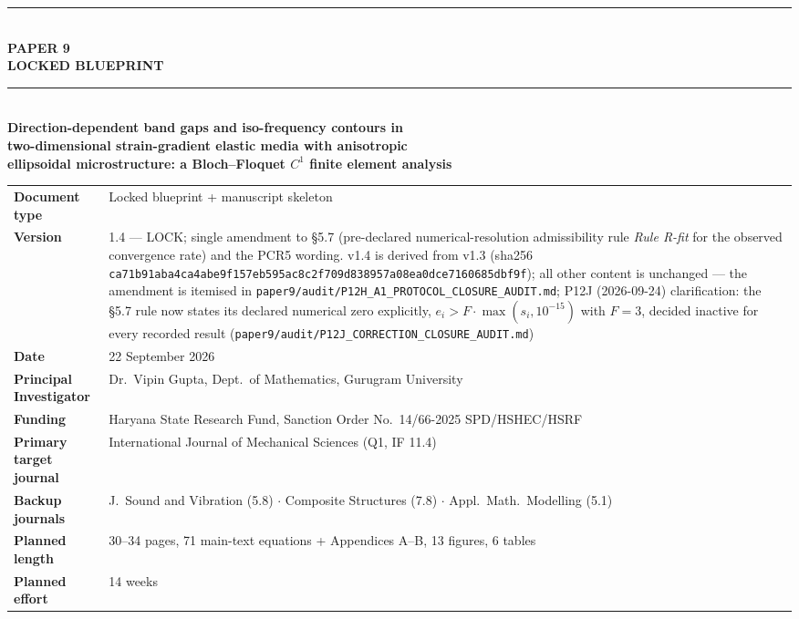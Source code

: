 \documentclass[11pt,a4paper]{article}
\begin{document}
\begin{titlepage}
\centering
\vspace*{0.6cm}
{\color{accent}\rule{\textwidth}{1.2pt}}\\[0.5cm]
{\Huge\bfseries\color{lockblue} PAPER 9}\\[0.35cm]
{\Large\bfseries LOCKED BLUEPRINT}\\[0.9cm]
{\color{accent}\rule{\textwidth}{0.6pt}}\\[1.1cm]

{\large\bfseries Direction-dependent band gaps and iso-frequency contours in\\[0.25cm]
two-dimensional strain-gradient elastic media with anisotropic\\[0.25cm]
ellipsoidal microstructure: a Bloch--Floquet $C^1$ finite element analysis}\\[1.3cm]

\begin{minipage}{0.86\textwidth}
\centering\footnotesize
\begin{tabular}{@{}>{\bfseries}p{3.5cm} p{9.6cm}@{}}
\textbf{Document type} & Locked blueprint + manuscript skeleton \\
\textbf{Version} & 1.4 --- LOCK; single amendment to \S5.7 (pre-declared numerical-resolution admissibility rule \emph{Rule R-fit} for the observed convergence rate) and the PCR5 wording. v1.4 is derived from v1.3 (sha256 \texttt{ca71b91aba4ca4abe9f157eb595ac8c2f709d838957a08ea0dce7160685dbf9f}); all other content is unchanged --- the amendment is itemised in \texttt{paper9/audit/P12H\_A1\_PROTOCOL\_CLOSURE\_AUDIT.md}; P12J (2026-09-24) clarification: the \S5.7 rule now states its declared numerical zero explicitly, $e_i > F \cdot \max(s_i, 10^{-15})$ with $F = 3$, decided inactive for every recorded result (\texttt{paper9/audit/P12J\_CORRECTION\_CLOSURE\_AUDIT.md}) \\
\textbf{Date} & 22 September 2026 \\
\textbf{Principal Investigator} & Dr.\ Vipin Gupta, Dept.\ of Mathematics, Gurugram University \\
\textbf{Funding} & Haryana State Research Fund, Sanction Order No.\ 14/66-2025 SPD/HSHEC/HSRF \\
\textbf{Primary target journal} & International Journal of Mechanical Sciences (Q1, IF 11.4) \\
\textbf{Backup journals} & J.\ Sound and Vibration (5.8) $\cdot$ Composite Structures (7.8) $\cdot$ Appl.\ Math.\ Modelling (5.1) \\
\textbf{Planned length} & 30--34 pages, 71 main-text equations + Appendices A--B, 13 figures, 6 tables \\
\textbf{Planned effort} & 14 weeks \\
\end{tabular}
\end{minipage}


\end{titlepage}
\end{document}
